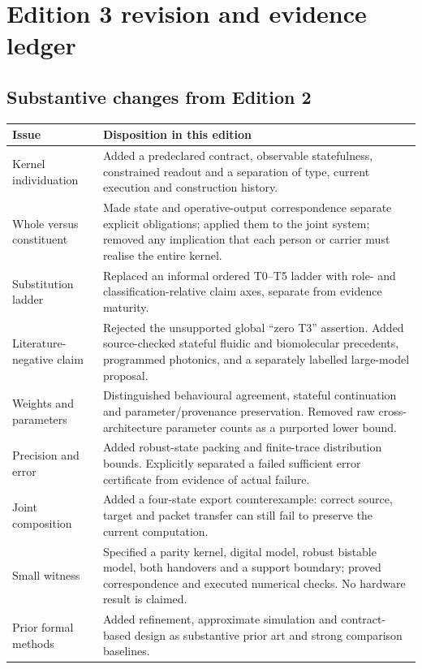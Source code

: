\section{Edition 3 revision and evidence ledger}\label{app:edition}
\subsection{Substantive changes from Edition 2}
\begin{longtable}{@{}>{\raggedright\arraybackslash}p{}>{\raggedright\arraybackslash}p{}@{}}\toprule
Issue & Disposition in this edition\\\midrule\endhead
Kernel individuation & Added a predeclared contract, observable statefulness, constrained readout and a separation of type, current execution and construction history.\\
Whole versus constituent & Made state and operative-output correspondence separate explicit obligations; applied them to the joint system; removed any implication that each person or carrier must realise the entire kernel.\\
Substitution ladder & Replaced an informal ordered T0--T5 ladder with role- and classification-relative claim axes, separate from evidence maturity.\\
Literature-negative claim & Rejected the unsupported global ``zero T3'' assertion. Added source-checked stateful fluidic and biomolecular precedents, programmed photonics, and a separately labelled large-model proposal.\\
Weights and parameters & Distinguished behavioural agreement, stateful continuation and parameter/provenance preservation. Removed raw cross-architecture parameter counts as a purported lower bound.\\
Precision and error & Added robust-state packing and finite-trace distribution bounds. Explicitly separated a failed sufficient error certificate from evidence of actual failure.\\
Joint composition & Added a four-state export counterexample: correct source, target and packet transfer can still fail to preserve the current computation.\\
Small witness & Specified a parity kernel, digital model, robust bistable model, both handovers and a support boundary; proved correspondence and executed numerical checks. No hardware result is claimed.\\
Prior formal methods & Added refinement, approximate simulation and contract-based design as substantive prior art and strong comparison baselines.\\

\end{longtable}
